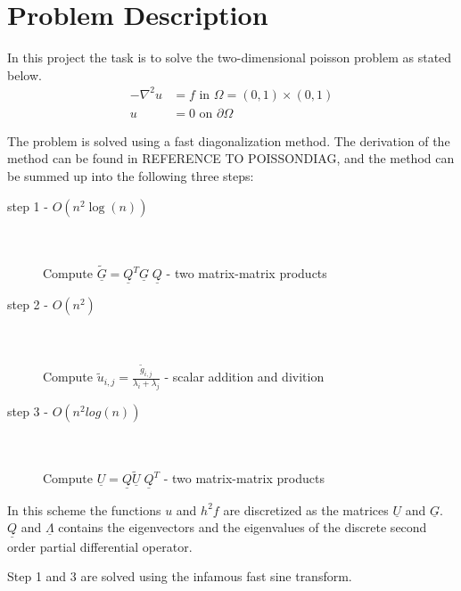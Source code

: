 \section{Problem Description}

In this project the task is to solve the two-dimensional poisson problem as stated below.
\begin{align}
	-\nabla^2 u &= f  \text{ in } \Omega = (0,1)\times(0,1) \\
	u &=  0 \text{ on } \partial \Omega
\end{align}

The problem is solved using a fast diagonalization method. The derivation of the method can be found in  REFERENCE TO POISSONDIAG, 
and the method can be summed up into the following three steps:


\begin{description}
	\item[step 1  -  $O(n^2\log(n))$] \hfill \\ \hfill \\
		Compute $\underline{\tilde{G}} = \underline{Q}^T\underline{G} \; \underline{Q} $    -    two matrix-matrix products 
		\hfill \\
	\item[step 2  -  $O(n^2)$] \hfill \\ \hfill \\
		Compute $\tilde{u}_{i,j} = \frac{\tilde{g}_{i,j}}{\lambda_i+\lambda_j}$    -    scalar addition and divition
		\hfill \\
	\item[step 3  -  $O(n^2log(n))$] \hfill \\ \hfill \\
		Compute $\underline{U} = \underline{Q}\underline{\tilde{U}} \; \underline{Q}^T $    -     two matrix-matrix products 
\end{description}

In this scheme the functions $u$ and $h^2 f$ are discretized as the matrices $\underline{U}$ and $\underline{G}$. 
$\underline{Q}$ and $\underline{\Lambda}$ contains the eigenvectors and the eigenvalues of the discrete 
second order partial differential operator. 

Step 1 and 3 are solved using the infamous fast sine transform.
